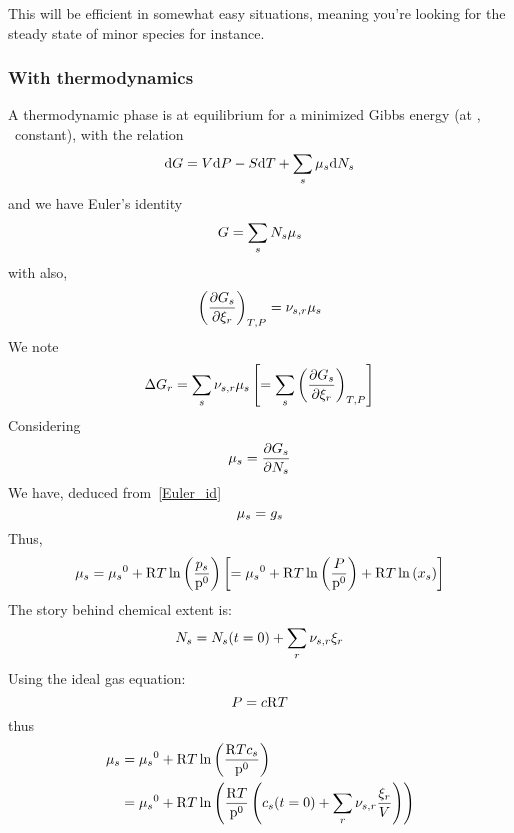 This will be efficient in somewhat easy situations, meaning you're looking for the
steady state of minor species for instance.

\subsubsection{With thermodynamics}
A thermodynamic phase is at equilibrium for a minimized Gibbs energy (at \Temp, \Press\ constant), with
the relation
\begin{equation}
\dd\Gibbs = \Vol\dd\Press - \Entr\dd\Temp + \sum_s\chempot[s]\dd\Mol[s]
\end{equation}
and we have Euler's identity
\begin{equation}
\Gibbs = \sum_s \Mol[s]\chempot[s]
\label{Euler_id}
\end{equation}
with also,
\begin{equation}
\left(\doverdext[r]{\Gibbs[s]}\right)_{\Temp,\Press} = \scoef[s,r]\chempot[s]
\end{equation}
We note
\begin{equation}
\DGibbs_r = \sum_s \scoef[s,r]\chempot[s] \left[= \sum_s \left(\doverdext[r]{\Gibbs[s]}\right)_{\Temp,\Press}\right]
\end{equation}
Considering
\begin{equation}
\chempot_s = \doverdn[s]{\Gibbs[s]}
\end{equation}
We have, deduced from~\ref{Euler_id}
\begin{equation}
\chempot[s] = \gibbs[s]
\end{equation}
Thus,
\begin{equation}
\chempot[s] = \chempotZ[s] + \Rg\Temp\ln\left(\frac{\press[s]}{\pz}\right)
     \left[ = \chempotZ[s] + \Rg\Temp\ln\left(\frac{\Press}{\pz}\right) + \Rg\Temp\ln\left(\molarfrac[s]\right) \right]
\end{equation}
The story behind chemical extent is:
\begin{equation}
\Mol[s] = \Mol[s](t=0) + \sum_r \scoef[s,r] \ext[r]
\end{equation}
Using the ideal gas equation:
\begin{equation}
\Press = \conc \Rg \Temp
\end{equation}
thus
\begin{equation}
\begin{split}
\chempot[s] & = \chempotZ[s] + \Rg\Temp\ln\left(\frac{\Rg \Temp \molar[s]}{\pz}\right) \\
            & = \chempotZ[s] + \Rg\Temp\ln\left(\frac{\Rg \Temp}{\pz}\left(\molar[s](t=0) + \sum_r \scoef[s,r]\frac{\ext[r]}{\Vol}\right)\right) \\
\end{split}
\end{equation}
